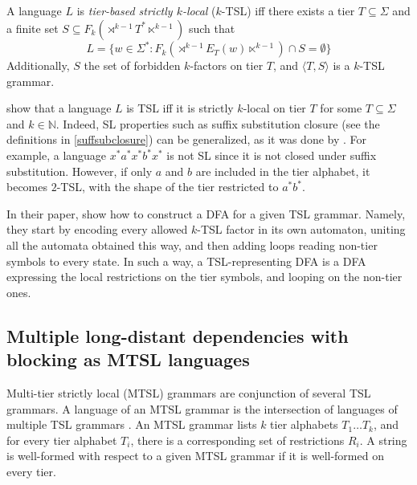 \begin{definition}
A language $L$ is \emph{tier-based strictly $k$-local} ($k$-TSL) iff there exists a tier $T \subseteq \Sigma$ and a finite set $S \subseteq F_k(\rtimes^{k-1} T^* \ltimes^{k-1})$ such that
\[
L = \{ w \in \Sigma^* :   F_k(\rtimes^{k-1} E_T(w) \ltimes^{k-1})  \cap S = \emptyset \}
\]
Additionally, $S$ the set of forbidden $k$-factors on tier $T$, and $\langle T, S\rangle$ is a $k$-TSL grammar.
\end{definition}

\cite{DeSantoGraf19FG} show that a language $L$ is TSL iff it is strictly $k$-local on tier $T$ for some $T \subseteq \Sigma$ and $k \in \mathbb{N}$.
Indeed, SL properties such as suffix substitution closure (see the definitions in \ref{suffsubclosure}) can be generalized, as it was done by \cite{LambertRogers2020}.
For example, a language $x^*a^*x^*b^*x^*$ is not SL since it is not closed under suffix substitution.
However, if only $a$ and $b$ are included in the tier alphabet, it becomes $2$-TSL, with the shape of the tier restricted to $a^*b^*$. 



In their paper, \cite{LambertRogers2020} show how to construct a DFA for a given TSL grammar.
Namely, they start by encoding every allowed $k$-TSL factor in its own automaton, uniting all the automata obtained this way, and then adding loops reading non-tier symbols to every state.
In such a way, a TSL-representing DFA is a DFA expressing the local restrictions on the tier symbols, and looping on the non-tier ones.







\subsection{Multiple long-distant dependencies with blocking as MTSL languages}

Multi-tier strictly local (MTSL) grammars are conjunction of several TSL grammars.
A language of an MTSL grammar is the intersection of languages of multiple TSL grammars \citep{DeSantoGraf19FG}.
An MTSL grammar lists $k$ tier alphabets $T_1 \dots T_k$, and for every tier alphabet $T_i$, there is a corresponding set of restrictions $R_i$.
A string is well-formed with respect to a given MTSL grammar if it is well-formed on every tier.




